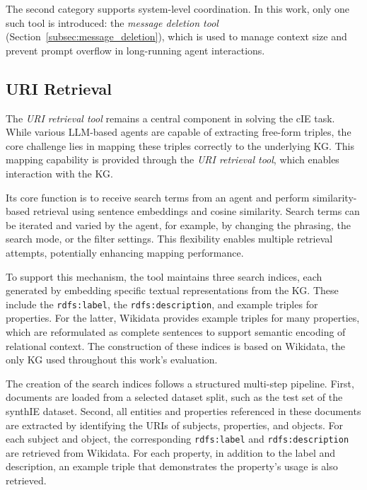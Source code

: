 \documentclass[a4paper,oneside,bibliography=totoc]{scrbook}
\begin{document}
The second category supports system-level coordination. In this work, only one such tool is introduced: the \textit{message deletion tool} (Section~\ref{subsec:message_deletion}), which is used to manage context size and prevent prompt overflow in long-running agent interactions.

\subsection{URI Retrieval}
\label{subsec:uri_retrieval}

The \textit{\ac{URI} retrieval tool} remains a central component in solving the \ac{cIE} task. While various \ac{LLM}-based agents are capable of extracting free-form triples, the core challenge lies in mapping these triples correctly to the underlying \ac{KG}. This mapping capability is provided through the \textit{\ac{URI} retrieval tool}, which enables interaction with the \ac{KG}.

Its core function is to receive search terms from an agent and perform similarity-based retrieval using sentence embeddings and cosine similarity. Search terms can be iterated and varied by the agent, for example, by changing the phrasing, the search mode, or the filter settings. This flexibility enables multiple retrieval attempts, potentially enhancing mapping performance.

To support this mechanism, the tool maintains three search indices, each generated by embedding specific textual representations from the \ac{KG}. These include the \texttt{rdfs:label}, the \texttt{rdfs:description}, and example triples for properties. For the latter, Wikidata provides example triples for many properties, which are reformulated as complete sentences to support semantic encoding of relational context. The construction of these indices is based on Wikidata, the only \ac{KG} used throughout this work's evaluation.

The creation of the search indices follows a structured multi-step pipeline. First, documents are loaded from a selected dataset split, such as the test set of the synthIE dataset. Second, all entities and properties referenced in these documents are extracted by identifying the \acp{URI} of subjects, properties, and objects. For each subject and object, the corresponding \texttt{rdfs:label} and \texttt{rdfs:description} are retrieved from Wikidata. For each property, in addition to the label and description, an example triple that demonstrates the property's usage is also retrieved.
\end{document}
